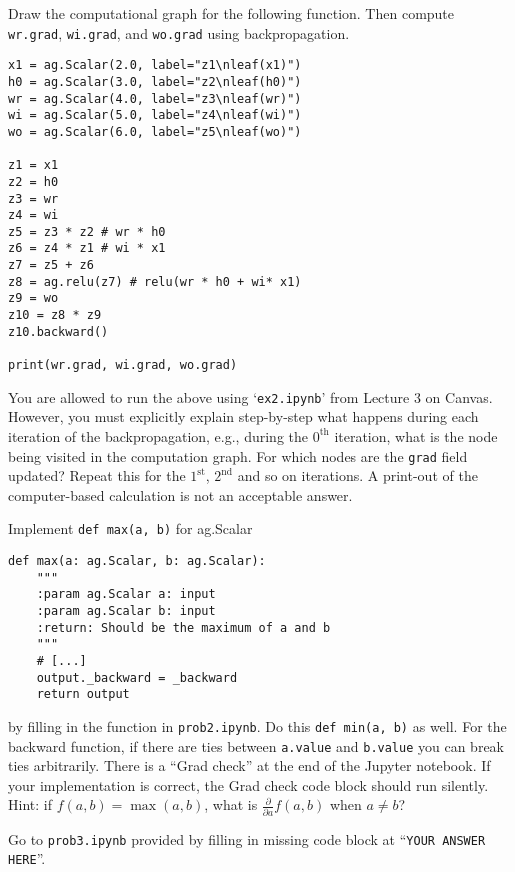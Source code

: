 \documentclass[
	number={2}
]{cs577homework}
\begin{document}
\maketitle

Draw the computational graph for the following function.
Then compute \texttt{wr.grad}, \texttt{wi.grad}, and \texttt{wo.grad} using backpropagation.

\begin{verbatim}
x1 = ag.Scalar(2.0, label="z1\nleaf(x1)")
h0 = ag.Scalar(3.0, label="z2\nleaf(h0)")
wr = ag.Scalar(4.0, label="z3\nleaf(wr)")
wi = ag.Scalar(5.0, label="z4\nleaf(wi)")
wo = ag.Scalar(6.0, label="z5\nleaf(wo)")

z1 = x1
z2 = h0
z3 = wr
z4 = wi
z5 = z3 * z2 # wr * h0
z6 = z4 * z1 # wi * x1
z7 = z5 + z6
z8 = ag.relu(z7) # relu(wr * h0 + wi* x1)
z9 = wo
z10 = z8 * z9
z10.backward()

print(wr.grad, wi.grad, wo.grad)
\end{verbatim}

\noindent You are allowed to run the above using `\texttt{ex2.ipynb}' from Lecture 3 on Canvas.
However, you must explicitly explain step-by-step what happens during each iteration of the backpropagation, e.g., during the $0^{\text{th}}$ iteration, what is the node being visited in the computation graph.
For which nodes are the \texttt{grad} field updated?
Repeat this for the $1^{\text{st}}$, $2^{\text{nd}}$ and so on iterations.
A print-out of the computer-based calculation is not an acceptable answer.

\problemline

Implement \texttt{def max(a, b)} for ag.Scalar
\begin{verbatim}
def max(a: ag.Scalar, b: ag.Scalar):
	"""
	:param ag.Scalar a: input
	:param ag.Scalar b: input
	:return: Should be the maximum of a and b
	"""
	# [...]
	output._backward = _backward
	return output
\end{verbatim}
by filling in the function in \texttt{prob2.ipynb}.
Do this \texttt{def min(a, b)} as well.
For the backward function, if there are ties between \texttt{a.value} and \texttt{b.value} you can break ties arbitrarily.
There is a ``Grad check'' at the end of the Jupyter notebook.
If your implementation is correct, the Grad check code block should run silently.\\
\indent
Hint: if $f(a, b) = \max(a, b)$, what is $\frac{\partial}{\partial a}f(a, b)$ when $a \neq b$?

\problemline

Go to \texttt{prob3.ipynb} provided by filling in missing code block at ``\texttt{YOUR ANSWER HERE}''.
\end{document}
